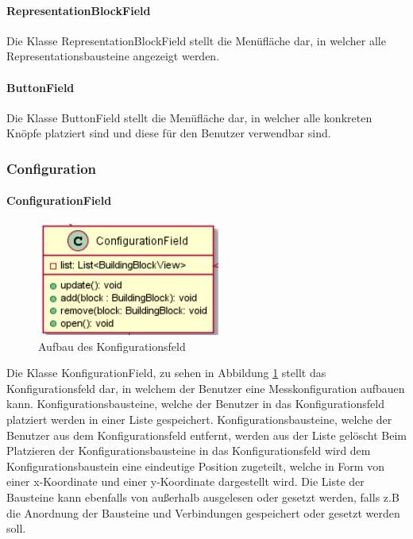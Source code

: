\documentclass[parskip=full]{scrartcl}
\begin{document}
\paragraph{RepresentationBlockField}
Die Klasse RepresentationBlockField stellt die Menüfläche dar, in welcher alle Representationsbausteine angezeigt werden.

\paragraph{ButtonField}
Die Klasse ButtonField stellt die Menüfläche dar, in welcher alle konkreten Knöpfe platziert sind und diese für den Benutzer verwendbar sind.

\subsubsection{Configuration}


\paragraph{ConfigurationField}

\begin{figure}[htbp]
	\begin{center}
		\includegraphics[width = 6cm]{Grafiken/View/ConfigurationField.png}
		\caption{Aufbau des Konfigurationsfeld}
		\label{Konfigurationsfeld}
	\end{center}
\end{figure}

Die Klasse KonfigurationField, zu sehen in Abbildung \ref{Konfigurationsfeld} stellt das Konfigurationsfeld dar, in welchem der Benutzer eine Messkonfiguration aufbauen kann.
Konfigurationsbausteine, welche der Benutzer in das Konfigurationsfeld platziert werden in einer Liste gespeichert. 
Konfigurationsbausteine, welche der Benutzer aus dem Konfigurationsfeld entfernt, werden aus der Liste gelöscht
Beim Platzieren der Konfigurationsbausteine in das Konfigurationsfeld wird dem Konfigurationsbaustein eine eindeutige Position zugeteilt, welche in Form von einer x-Koordinate und einer y-Koordinate dargestellt wird.
Die Liste der Bausteine kann ebenfalls von außerhalb ausgelesen oder gesetzt werden, falls z.B die Anordnung der Bausteine und Verbindungen gespeichert oder gesetzt werden soll.
\end{document}

